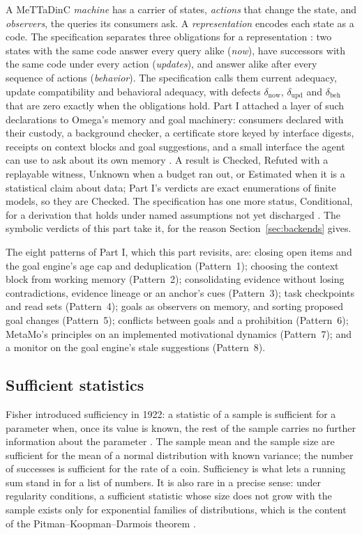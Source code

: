 \documentclass[11pt]{article}
\newcommand{\dnow}{\delta_{\mathrm{now}}}
\newcommand{\dupd}{\delta_{\mathrm{upd}}}
\newcommand{\dbd}{\delta_{\mathrm{beh}}}
\theoremstyle{definition}
\theoremstyle{plain}
\begin{document}
A MeTTaDinC \emph{machine} has a carrier of states, \emph{actions} that change the state, and
\emph{observers}, the queries its consumers ask. A \emph{representation} encodes each state as a
code. The specification separates three obligations for a representation
\cite[Section~4.2]{spec}: two states with the same code answer every query alike (\emph{now}),
have successors with the same code under every action (\emph{updates}), and answer alike after
every sequence of actions (\emph{behavior}). The specification calls them current adequacy, update
compatibility and behavioral adequacy, with defects $\dnow$, $\dupd$ and $\dbd$ that are zero
exactly when the obligations hold. Part I attached a layer of such declarations to
Omega's memory and goal machinery: consumers declared with their custody, a background checker,
a certificate store keyed by interface digests, receipts on context blocks and goal suggestions,
and a small interface the agent can use to ask about its own memory \cite{part1}. A result is
Checked, Refuted with a replayable witness, Unknown when a budget ran out, or Estimated when it is
a statistical claim about data; Part I's verdicts are exact enumerations of finite models, so they
are Checked. The specification has one more status, Conditional, for a derivation that holds under
named assumptions not yet discharged \cite[Section~2.2]{spec}. The symbolic verdicts of this part
take it, for the reason Section~\ref{sec:backends} gives.

The eight patterns of Part I, which this part revisits, are: closing open items and the goal
engine's age cap and deduplication (Pattern~1); choosing the context block from working memory
(Pattern~2); consolidating evidence without losing contradictions, evidence lineage or an anchor's
cues (Pattern~3); task checkpoints and read sets (Pattern~4); goals as observers on memory, and
sorting proposed goal changes (Pattern~5); conflicts between goals and a prohibition (Pattern~6);
MetaMo's principles on an implemented motivational dynamics (Pattern~7); and a monitor on the goal
engine's stale suggestions (Pattern~8).

\subsection{Sufficient statistics}\label{sec:bg-suff}

Fisher introduced sufficiency in 1922: a statistic of a sample is sufficient for a parameter when,
once its value is known, the rest of the sample carries no further information about the parameter
\cite{fisher}. The sample mean and the sample size are sufficient for the mean of a normal
distribution with known variance; the number of successes is sufficient for the rate of a coin.
Sufficiency is what lets a running sum stand in for a list of numbers. It is also rare in a precise
sense: under regularity conditions, a sufficient statistic whose size does not grow with the sample
exists only for exponential families of distributions, which is the content of the
Pitman--Koopman--Darmois theorem \cite{koopman}.
\end{document}
